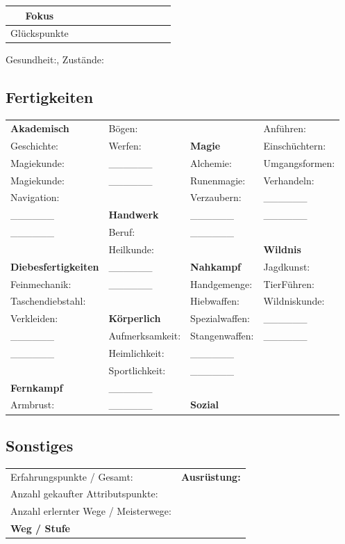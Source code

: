 \documentclass{article}
\begin{document}
\medskip
\newline\hline
\medskip
\begin{tabular}{| c | c | c | c | c | c | c | c | c | c | c |}
\hline
Fokus&&&&&&&&&&\\
\hline
Glückspunkte&&&&&&&&&&\\
\hline
\end{tabular}
\newline

Gesundheit:\space\space\space\space\space, Zustände:
\newline\hline
\begin{center}
\subsection{Fertigkeiten}
\end{center}
\begin{tabular}{ m{4cm}  m{4cm}  m{4cm}  m{4cm} }
\textbf{Akademisch}&Bögen:&&Anführen:\\
Geschichte:&Werfen:&\textbf{Magie}&Einschüchtern:\\
Magiekunde:&\_\_\_\_\_\_&Alchemie:&Umgangsformen:\\
Magiekunde:&\_\_\_\_\_\_&Runenmagie:&Verhandeln:\\
Navigation:&&Verzaubern:&\_\_\_\_\_\_\\
\_\_\_\_\_\_&\textbf{Handwerk}&\_\_\_\_\_\_&\_\_\_\_\_\_\\
\_\_\_\_\_\_&Beruf:&\_\_\_\_\_\_&\\
&Heilkunde:&&\textbf{Wildnis}\\
\textbf{Diebesfertigkeiten}&\_\_\_\_\_\_&\textbf{Nahkampf}&Jagdkunst:\\
Feinmechanik:&\_\_\_\_\_\_&Handgemenge:&TierFühren:\\
Taschendiebstahl:&&Hiebwaffen:&Wildniskunde:\\
Verkleiden:&\textbf{Körperlich}&Spezialwaffen:&\_\_\_\_\_\_\\
\_\_\_\_\_\_&Aufmerksamkeit:&Stangenwaffen:&\_\_\_\_\_\_\\
\_\_\_\_\_\_&Heimlichkeit:&\_\_\_\_\_\_&\\
&Sportlichkeit:&\_\_\_\_\_\_&\\
\textbf{Fernkampf}&\_\_\_\_\_\_&&\\
Armbrust:&\_\_\_\_\_\_&\textbf{Sozial}&\\
\end{tabular}

\newline\hline
\begin{center}
\subsection{Sonstiges}
\end{center}
\begin{tabular}{ m{10cm} m{10cm}}
Erfahrungspunkte / Gesamt:&\textbf{Ausrüstung:}\\
Anzahl gekaufter Attributspunkte:&\\
Anzahl erlernter Wege / Meisterwege:&\\
\textbf{Weg / Stufe}&\\
\end{tabular}
\end{document}
